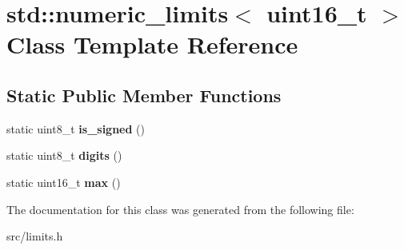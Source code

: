 \hypertarget{classstd_1_1numeric__limits_3_01uint16__t_01_4}{}\section{std\+:\+:numeric\+\_\+limits$<$ uint16\+\_\+t $>$ Class Template Reference}
\label{classstd_1_1numeric__limits_3_01uint16__t_01_4}
\subsection*{Static Public Member Functions}
\begin{DoxyCompactItemize}
\item 
\hypertarget{classstd_1_1numeric__limits_3_01uint16__t_01_4_afb86f68ec1ed3973f6112457d8fa25bb}{}\label{classstd_1_1numeric__limits_3_01uint16__t_01_4_afb86f68ec1ed3973f6112457d8fa25bb} 
static uint8\+\_\+t {\bfseries is\+\_\+signed} ()
\item 
\hypertarget{classstd_1_1numeric__limits_3_01uint16__t_01_4_af8baf757e5505a7ee8c78f1e5f98f285}{}\label{classstd_1_1numeric__limits_3_01uint16__t_01_4_af8baf757e5505a7ee8c78f1e5f98f285} 
static uint8\+\_\+t {\bfseries digits} ()
\item 
\hypertarget{classstd_1_1numeric__limits_3_01uint16__t_01_4_ac51d5d78ead4199574e0831c136ca395}{}\label{classstd_1_1numeric__limits_3_01uint16__t_01_4_ac51d5d78ead4199574e0831c136ca395} 
static uint16\+\_\+t {\bfseries max} ()
\end{DoxyCompactItemize}


The documentation for this class was generated from the following file\+:\begin{DoxyCompactItemize}
\item 
src/limits.\+h\end{DoxyCompactItemize}
